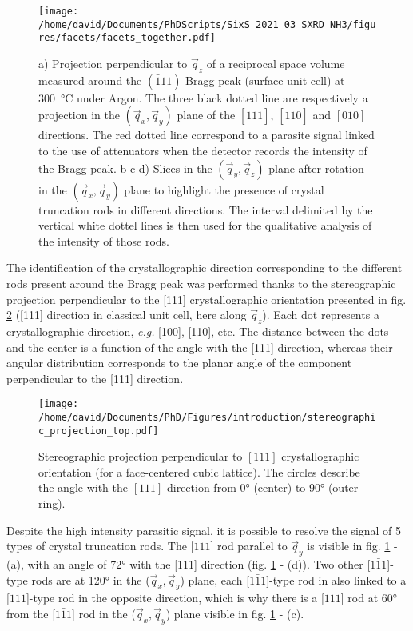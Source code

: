 \begin{figure}[!htb]
    \centering
    \texttt{[image: /home/david/Documents/PhDScripts/SixS\_2021\_03\_SXRD\_NH3/figures/facets/facets\_together.pdf]}
    \caption{
        a) Projection perpendicular to $\vec{q}_z$ of a reciprocal space volume measured around the $(\bar{1}11)$ Bragg peak (surface unit cell) at \qty{300}{\degreeCelsius} under Argon.
        The three black dotted line are respectively a projection in the $(\vec{q}_x, \vec{q}_y)$ plane of the $[\bar{1}11]$, $[\bar{1}10]$ and $[010]$ directions.
        The red dotted line correspond to a parasite signal linked to the use of attenuators when the detector records the intensity of the Bragg peak.
        b-c-d) Slices in the $(\vec{q}_y, \vec{q}_z)$ plane after rotation in the $(\vec{q}_x, \vec{q}_y)$ plane to highlight the presence of crystal truncation rods in different directions.
        The interval delimited by the vertical white dottel lines is then used for the qualitative analysis of the intensity of those rods.
    }
    \label{fig:FacetMaps}
\end{figure}

The identification of the crystallographic direction corresponding to the different rods present around the Bragg peak was performed thanks to the stereographic projection perpendicular to the [111] crystallographic orientation presented in fig. \ref{fig:StereoTop} ([111] direction in classical unit cell, here along $\vec{q}_z$).
Each dot represents a crystallographic direction, \textit{e.g.} [100], [110], etc.
The distance between the dots and the center is a function of the angle with the [111] direction, whereas their angular distribution corresponds to the planar angle of the component perpendicular to the [111] direction.

\begin{figure}[!htb]
    \centering
    \texttt{[image: /home/david/Documents/PhD/Figures/introduction/stereographic\_projection\_top.pdf]}
    \caption{
        Stereographic projection perpendicular to $[111]$ crystallographic orientation (for a face-centered cubic lattice).
        The circles describe the angle with the $[111]$ direction from \ang{0} (center) to \ang{90} (outer-ring).
    }
    \label{fig:StereoTop}
\end{figure}

Despite the high intensity parasitic signal, it is possible to resolve the signal of 5 types of crystal truncation rods.
The [$1\bar{1}1$] rod parallel to $\vec{q}_y$ is visible in fig. \ref{fig:FacetMaps} - (a), with an angle of \ang{72} with the [111] direction (fig. \ref{fig:FacetMaps} - (d)).
Two other [$1\bar{1}1$]-type rods are at \ang{120} in the ($\vec{q}_x, \vec{q}_y$) plane, each [$1\bar{1}1$]-type rod in also linked to a [$\bar{1}1\bar{1}$]-type rod in the opposite direction, which is why there is a [$\bar{1}\bar{1}1$] rod at \ang{60} from the [$1\bar{1}1$] rod in the ($\vec{q}_x, \vec{q}_y$) plane visible in fig. \ref{fig:FacetMaps} - (c).

